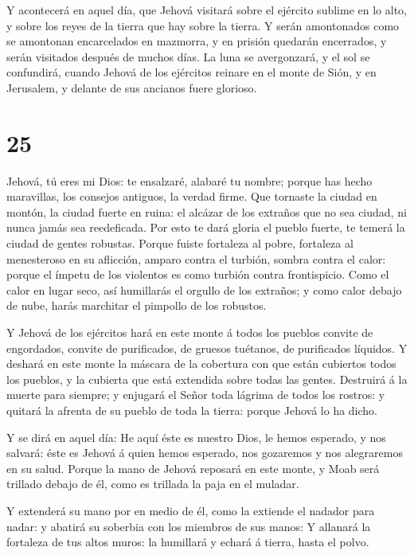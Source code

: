  Y acontecerá en aquel día, que Jehová visitará sobre el
ejército sublime en lo alto, y sobre los reyes de la tierra que hay
sobre la tierra.  Y serán amontonados como se amontonan
encarcelados en mazmorra, y en prisión quedarán encerrados, y serán
visitados después de muchos días.  La luna se avergonzará,
y el sol se confundirá, cuando Jehová de los ejércitos reinare en el
monte de Sión, y en Jerusalem, y delante de sus ancianos fuere glorioso.

\hypertarget{section-24}{%
\section{25}\label{section-24}}

 Jehová, tú eres mi Dios: te ensalzaré, alabaré tu nombre;
porque has hecho maravillas, los consejos antiguos, la verdad firme.
 Que tornaste la ciudad en montón, la ciudad fuerte en
ruina: el alcázar de los extraños que no sea ciudad, ni nunca jamás sea
reedeficada.  Por esto te dará gloria el pueblo fuerte, te
temerá la ciudad de gentes robustas.  Porque fuiste
fortaleza al pobre, fortaleza al menesteroso en su aflicción, amparo
contra el turbión, sombra contra el calor: porque el ímpetu de los
violentos es como turbión contra frontispicio.  Como el
calor en lugar seco, así humillarás el orgullo de los extraños; y como
calor debajo de nube, harás marchitar el pimpollo de los robustos.

 Y Jehová de los ejércitos hará en este monte á todos los
pueblos convite de engordados, convite de purificados, de gruesos
tuétanos, de purificados líquidos.  Y deshará en este monte
la máscara de la cobertura con que están cubiertos todos los pueblos, y
la cubierta que está extendida sobre todas las gentes. 
Destruirá á la muerte para siempre; y enjugará el Señor toda lágrima de
todos los rostros: y quitará la afrenta de su pueblo de toda la tierra:
porque Jehová lo ha dicho.

 Y se dirá en aquel día: He aquí éste es nuestro Dios, le
hemos esperado, y nos salvará: éste es Jehová á quien hemos esperado,
nos gozaremos y nos alegraremos en su salud.  Porque la
mano de Jehová reposará en este monte, y Moab será trillado debajo de
él, como es trillada la paja en el muladar.

 Y extenderá su mano por en medio de él, como la extiende
el nadador para nadar: y abatirá su soberbia con los miembros de sus
manos:  Y allanará la fortaleza de tus altos muros: la
humillará y echará á tierra, hasta el polvo.

